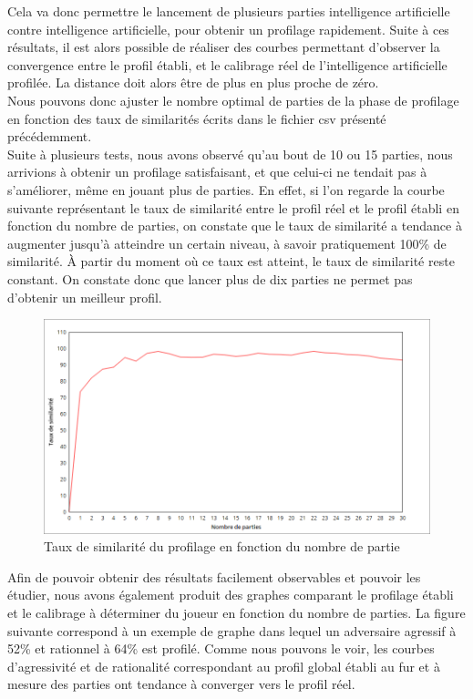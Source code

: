 \documentclass{report}
\begin{document}
Cela va donc permettre le lancement de plusieurs parties intelligence artificielle contre intelligence artificielle, pour obtenir un profilage rapidement. Suite à ces résultats, il est alors possible de réaliser des courbes permettant d'observer la convergence entre le profil établi, et le calibrage réel de l'intelligence artificielle profilée. La distance doit alors être de plus en plus proche de zéro.\\

Nous pouvons donc ajuster le nombre optimal de parties de la phase de profilage en fonction des taux de similarités écrits dans le fichier csv présenté précédemment.\\

Suite à plusieurs tests, nous avons observé qu'au bout de 10 ou 15 parties, nous arrivions à obtenir un profilage satisfaisant, et que celui-ci ne tendait pas à s'améliorer, même en jouant plus de parties. En effet, si l'on regarde la courbe suivante représentant le taux de similarité entre le profil réel et le profil établi en fonction du nombre de parties, on constate que le taux de similarité a tendance à augmenter jusqu'à atteindre un certain niveau, à savoir pratiquement 100\% de similarité. À partir du moment où ce taux est atteint, le taux de similarité reste constant. On constate donc que lancer plus de dix parties ne permet pas d'obtenir un meilleur profil. \\


\begin{figure}[H]
\hspace{-2cm}
		\includegraphics[scale=0.5]{./imagesRapport/profilageScenariosTestsAnalyseResultats.png}
	\caption{Taux de similarité du profilage en fonction du nombre de partie}
\end{figure}


Afin de pouvoir obtenir des résultats facilement observables et pouvoir les étudier, nous avons également produit des graphes comparant le profilage établi et le calibrage à déterminer du joueur en fonction du nombre de parties. La figure suivante correspond à un exemple de graphe dans lequel un adversaire agressif à 52\% et rationnel à 64\% est profilé. Comme nous pouvons le voir, les courbes d'agressivité et de rationalité correspondant au profil global établi au fur et à mesure des parties ont tendance à converger vers le profil réel. \\
\end{document}
